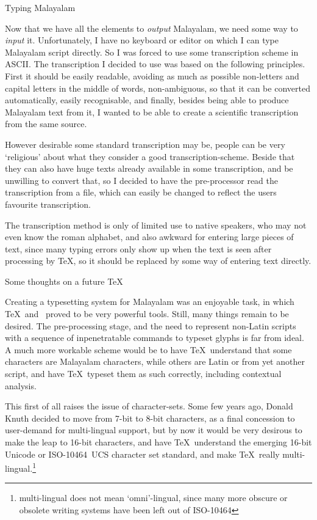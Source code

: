 \beginsection Typing Malayalam

Now that we have all the elements to {\it output\/} Malayalam, we need 
some way to {\it input\/} it. Unfortunately, I have no keyboard or 
editor on which I can type Malayalam script directly. So I was forced 
to use some transcription scheme in ASCII. The transcription I decided 
to use was based on the following principles. First it should be 
easily readable, avoiding as much as possible non-letters and capital 
letters in the middle of words, non-ambiguous, so that it can be 
converted automatically, easily recognisable, and finally, besides 
being able to produce Malayalam text from it, I wanted to be able to 
create a scientific transcription from the same source.

However desirable some standard transcription may be, people can be 
very `religious' about what they consider a good transcription-scheme. 
Beside that they can also have huge texts already available in some 
transcription, and be unwilling to convert that, so I decided to have 
the pre-processor read the transcription from a file, which can easily 
be changed to reflect the users favourite transcription.

The transcription method is only of limited use to native speakers, 
who may not even know the roman alphabet, and also awkward for 
entering large pieces of text, since many typing errors only show up 
when the text is seen after processing by \TeX, so it should be 
replaced by some way of entering text directly.

\beginsection Some thoughts on a future \TeX\par

Creating a typesetting system for Malayalam was an enjoyable task, in 
which \TeX\ and \MF\ proved to be very powerful tools. Still, many 
things remain to be desired. The pre-processing stage, and the need to 
represent non-Latin scripts with a sequence of inpenetratable commands 
to typeset glyphs is far from ideal. A much more workable scheme would 
be to have \TeX\ understand that some characters are Malayalam 
characters, while others are Latin or from yet another script, and 
have \TeX\ typeset them as such correctly, including contextual 
analysis.

This first of all raises the issue of character-sets. Some few years 
ago, Donald Knuth decided to move from 7-bit to 8-bit characters, as a 
final concession to user-demand for multi-lingual support, but by now 
it would be very desirous to make the leap to 16-bit characters, and 
have \TeX\ understand the emerging 16-bit Unicode or ISO-10464~UCS
character set standard, and make \TeX\ really 
multi-lingual.\footnote*{multi-lingual does not mean `omni'-lingual, 
since many more obscure or obsolete writing systems have been left 
out of ISO-10464}


